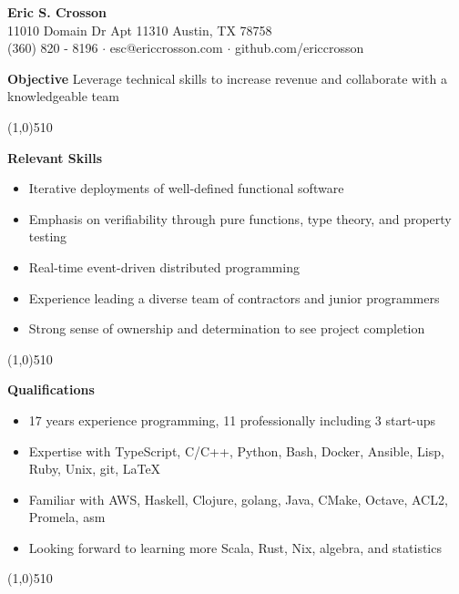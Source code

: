 \documentclass{report}
\newcommand{\cut}{\begin{center} \line(1,0){510} \end{center}}
\begin{document}
\pagestyle{empty}
\setlength\parindent{0pt}

\begin{center}
  \textbf{Eric S. Crosson} \\
  11010 Domain Dr Apt 11310 Austin, TX 78758 \\
  (360) 820 - 8196 $\cdot$ esc@ericcrosson.com $\cdot$ github.com/ericcrosson
\end{center}

\textbf{Objective} \hspace{1mm} Leverage technical skills to increase
revenue and collaborate with a knowledgeable team

\cut{}

\textbf{Relevant Skills}
\begin{itemize}[label=$\cdot$]
\item Iterative deployments of well-defined functional software
\item Emphasis on verifiability through pure functions, type theory, and property testing
\item Real-time event-driven distributed programming
\item Experience leading a diverse team of contractors and junior programmers
\item Strong sense of ownership and determination to see project completion
\end{itemize}

\cut{}

\textbf{Qualifications}
\begin{itemize}[label=$\cdot$]
\item 17 years experience programming, 11 professionally including 3 start-ups
\item Expertise with TypeScript, C/C++, Python, Bash, Docker, Ansible, Lisp, Ruby, Unix, git, \LaTeX{}
\item Familiar with AWS, Haskell, Clojure, golang, Java, CMake, Octave, ACL2, Promela, asm
\item Looking forward to learning more Scala, Rust, Nix, algebra, and statistics
\end{itemize}

\cut{}
\end{document}
